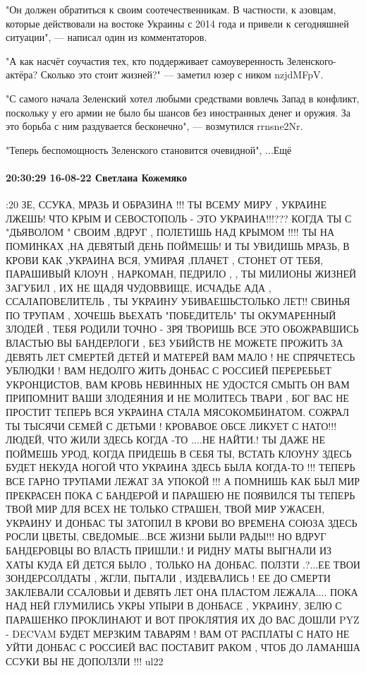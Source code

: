 "Он должен обратиться к своим соотечественникам. В частности, к азовцам,
которые действовали на востоке Украины с 2014 года и привели к сегодняшней
ситуации", — написал один из комментаторов.

"А как насчёт соучастия тех, кто поддерживает самоуверенность
Зеленского-актёра? Сколько это стоит жизней?" — заметил юзер с ником nzjdMFpV.

"С самого начала Зеленский хотел любыми средствами вовлечь Запад в конфликт,
поскольку у его армии не было бы шансов без иностранных денег и оружия. За это
борьба с ним раздувается бесконечно", — возмутился rrnsne2Nr.

"Теперь беспомощность Зеленского становится очевидной", ...Ещё

\paragraph{20:30:29 16-08-22 Светлана Кожемяко}

:20
ЗЕ, ССУКА, МРАЗЬ И ОБРАЗИНА !!!
ТЫ ВСЕМУ МИРУ , УКРАИНЕ ЛЖЕШЬ!
ЧТО КРЫМ И СЕВОСТОПОЛЬ
- ЭТО УКРАИНА!!!???
КОГДА ТЫ С "ДЬЯВОЛОМ "
СВОИМ ,ВДРУГ ,
ПОЛЕТИШЬ НАД КРЫМОМ !!!!
ТЫ НА ПОМИНКАХ ,НА ДЕВЯТЫЙ ДЕНЬ ПОЙМЕШЬ!
И ТЫ УВИДИШЬ МРАЗЬ,
В КРОВИ КАК ,УКРАИНА
ВСЯ, УМИРАЯ ,ПЛАЧЕТ ,
СТОНЕТ ОТ ТЕБЯ,
ПАРАШИВЫЙ КЛОУН ,
НАРКОМАН, ПЕДРИЛО , ,
ТЫ МИЛИОНЫ ЖИЗНЕЙ
ЗАГУБИЛ , ИХ НЕ ЩАДЯ
ЧУДОВВИЩЕ, ИСЧАДЬЕ АДА , ССАЛАПОВЕЛИТЕЛЬ ,
ТЫ УКРАИНУ УБИВАЕШЬСТОЛЬКО ЛЕТ!! СВИНЬЯ
ПО ТРУПАМ , ХОЧЕШЬ ВЬЕХАТЬ
"ПОБЕДИТЕЛЬ"
ТЫ ОКУМАРЕННЫЙ ЗЛОДЕЙ ,
ТЕБЯ РОДИЛИ ТОЧНО - ЗРЯ
ТВОРИШЬ ВСЕ ЭТО
ОБОЖРАВШИСЬ ВЛАСТЬЮ
ВЫ БАНДЕРЛОГИ ,
БЕЗ УБИЙСТВ НЕ МОЖЕТЕ ПРОЖИТЬ
ЗА ДЕВЯТЬ ЛЕТ СМЕРТЕЙ
ДЕТЕЙ И МАТЕРЕЙ ВАМ МАЛО !
НЕ СПРЯЧЕТЕСЬ УБЛЮДКИ !
ВАМ НЕДОЛГО ЖИТЬ
ДОНБАС С РОССИЕЙ
ПЕРЕРЕБЬЕТ УКРОНЦИСТОВ,
ВАМ КРОВЬ НЕВИННЫХ
НЕ УДОСТСЯ СМЫТЬ
ОН ВАМ ПРИПОМНИТ
ВАШИ ЗЛОДЕЯНИЯ
И НЕ МОЛИТЕСЬ ТВАРИ ,
БОГ ВАС НЕ ПРОСТИТ
ТЕПЕРЬ ВСЯ УКРАИНА
СТАЛА МЯСОКОМБИНАТОМ.
СОЖРАЛ ТЫ ТЫСЯЧИ СЕМЕЙ
С ДЕТЬМИ !
КРОВАВОЕ ОБСЕ
ЛИКУЕТ С НАТО!!!
ЛЮДЕЙ, ЧТО ЖИЛИ ЗДЕСЬ
КОГДА -ТО ....НЕ НАЙТИ.!
ТЫ ДАЖЕ НЕ ПОЙМЕШЬ УРОД,
КОГДА ПРИДЕШЬ В СЕБЯ ТЫ,
ВСТАТЬ КЛОУНУ ЗДЕСЬ
БУДЕТ НЕКУДА НОГОЙ
ЧТО УКРАИНА ЗДЕСЬ
БЫЛА КОГДА-ТО !!!
ТЕПЕРЬ ВСЕ ГАРНО ТРУПАМИ
ЛЕЖАТ ЗА УПОКОЙ !!!
А ПОМНИШЬ КАК
БЫЛ МИР ПРЕКРАСЕН
ПОКА С БАНДЕРОЙ
И ПАРАШЕЮ НЕ ПОЯВИЛСЯ ТЫ
ТЕПЕРЬ ТВОЙ МИР
ДЛЯ ВСЕХ НЕ ТОЛЬКО СТРАШЕН,
ТВОЙ МИР УЖАСЕН,
УКРАИНУ И ДОНБАС ТЫ ЗАТОПИЛ В КРОВИ
ВО ВРЕМЕНА СОЮЗА
ЗДЕСЬ РОСЛИ ЦВЕТЫ,
СВЕДОМЫЕ...ВСЕ ЖИЗНИ
БЫЛИ РАДЫ!!!
НО ВДРУГ БАНДЕРОВЦЫ
ВО ВЛАСТЬ ПРИШЛИ.!
И РИДНУ МАТЫ
ВЫГНАЛИ ИЗ ХАТЫ
КУДА ЕЙ ДЕТСЯ БЫЛО ,
ТОЛЬКО НА ДОНБАС.
ПОЛЗТИ .?...ЕЕ ТВОИ
ЗОНДЕРСОЛДАТЫ , ЖГЛИ,
ПЫТАЛИ , ИЗДЕВАЛИСЬ !
ЕЕ ДО СМЕРТИ
ЗАКЛЕВАЛИ ССАЛОВЬИ
И ДЕВЯТЬ ЛЕТ
ОНА ПЛАСТОМ ЛЕЖАЛА....
ПОКА НАД НЕЙ ГЛУМИЛИСЬ
УКРЫ УПЫРИ
В ДОНБАСЕ , УКРАИНУ, ЗЕЛЮ С ПАРАШЕНКО ПРОКЛИНАЮТ
И ВОТ ПРОКЛЯТИЯ
ИХ ДО ВАС ДОШЛИ
PYZ - DECVAM БУДЕТ
МЕРЗКИМ ТАВАРЯМ !
ВАМ ОТ РАСПЛАТЫ
С НАТО НЕ УЙТИ
ДОНБАС С РОССИЕЙ
ВАС ПОСТАВИТ РАКОМ ,
ЧТОБ ДО ЛАМАНША
ССУКИ ВЫ НЕ ДОПОЛЗЛИ !!!
ul22
\restorecr
